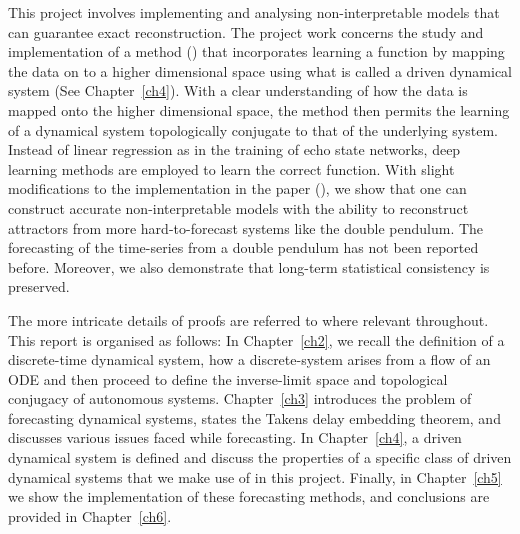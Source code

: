This project involves implementing and analysing non-interpretable models that can guarantee exact reconstruction. 
The project work concerns the study and implementation of a method (\cite{manjunath2021universal}) that incorporates learning a function by mapping the data on to a higher dimensional space using what is called a driven dynamical system (See Chapter~\ref{ch4}). With a clear understanding of how the data is mapped onto the higher dimensional space, the method then permits the learning of a dynamical system topologically conjugate to that of the underlying system. Instead of linear regression as in the training of echo state networks, deep learning methods are employed to learn the correct function. With slight modifications to the implementation in the paper (\cite{manjunath2021universal}), we show that one can construct accurate non-interpretable models with the ability to reconstruct attractors from more hard-to-forecast systems like the double pendulum. The forecasting of the time-series from a double pendulum has not been reported before. Moreover, we also demonstrate that long-term statistical consistency is preserved.


The more intricate details of proofs are referred to where relevant throughout. This report is organised as follows: 
\newline In Chapter~\ref{ch2}, we recall the definition of a discrete-time dynamical system, how a discrete-system arises from a flow of an ODE and then proceed to define the inverse-limit space and topological conjugacy of autonomous systems. 
\newline Chapter~\ref{ch3} introduces the problem of forecasting dynamical systems, states the Takens delay embedding theorem, and discusses various issues faced while forecasting. 
\newline In Chapter~\ref{ch4}, a driven dynamical system is defined and discuss the properties of a specific class of driven dynamical systems that we make use of in this project.
\newline Finally, in Chapter~\ref{ch5} we show the implementation of these forecasting methods, and conclusions are provided in Chapter~\ref{ch6}.


